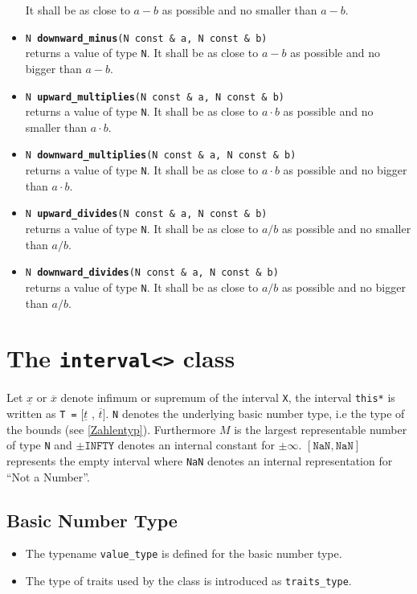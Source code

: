 \documentclass{report}
\begin{document}
\begin{itemize}
			It shall be as close to $a-b$ as possible and
			no smaller than $a-b$.
		\item \texttt{N {\bf downward\_minus}(N const \& a, N const \& b)}\\ 
			returns a value of type \texttt{N}.
			It shall be as close to $a-b$ as possible and
			no bigger than $a-b$.
		\item \texttt{N {\bf upward\_multiplies}(N const \& a, N const \& b)}\\
			returns a value of type \texttt{N}.
			It shall be as close to $a\cdot b$ as possible and
			no smaller than $a\cdot b$.
		\item \texttt{N {\bf downward\_multiplies}(N const \& a, N const \& b)}\\ 
			returns a value of type \texttt{N}.
			It shall be as close to $a\cdot b$ as possible and
			no bigger than $a\cdot b$.
		\item \texttt{N {\bf upward\_divides}(N const \& a, N const \& b)}\\
			returns a value of type \texttt{N}.
			It shall be as close to $a / b$ as possible and
			no smaller than $a / b$.
		\item \texttt{N {\bf downward\_divides}(N const \& a, N const \& b)}\\ 
			returns a value of type \texttt{N}.
			It shall be as close to $a / b$ as possible and
			no bigger than $a / b$.
	\end{itemize}

	\chapter{The \texttt{interval<>} class}
	Let $\underline{x}$ or $\overline{x}$ denote infimum or 
	supremum of the interval \texttt{X}, the interval \texttt{this*} is written as \texttt{T =}
	$[\underline{t}$ , $\overline{t}]$. \texttt{N} denotes the underlying
	basic number type,
  i.e the type of the bounds (see \ref{Zahlentyp}). 
  Furthermore
			$M$ is the largest representable  number of type
	\texttt{N} and
	$\pm \texttt{INFTY}$ denotes an internal constant for  $\pm \infty$.
			 $[\texttt{NaN},\texttt{NaN}]$
			represents the empty interval where \texttt{NaN}
	denotes an internal representation for ``Not a Number''.

\section{Basic Number Type}
\begin{itemize}
		\item The typename \texttt{value\_type} is defined for the basic
	number type.
		\item The type of traits used by the class is introduced
	as \texttt{traits\_type}.
\end{itemize}
\end{document}
